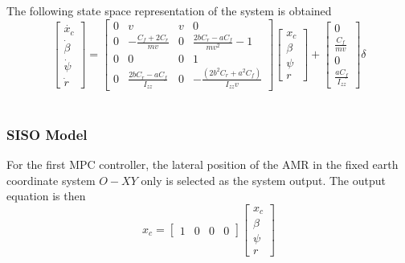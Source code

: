 \documentclass[a4paper, twocolumn]{article}
\begin{document}
\noindent
The following state space representation of the system is obtained
\footnotesize
$$
\begin{bmatrix}
    \dot{x_{c}}
    \\
    \dot{\beta}
    \\
    \dot{\psi}
    \\  
    \dot{r}
\end{bmatrix}=
\begin{bmatrix}
    0 & v & v & 0 \\ 
    0 & -\frac{C_{f}+2C_{r}}{mv} & 0 & \frac{2bC_{r} - aC_{f}}{mv^{2}} -1 \\ 
    0 & 0 & 0 & 1 \\ 
    0 & \frac{2bC_{r} - aC_{f}}{I_{zz}} & 0 & -\frac{\left(2b^{2}C_{r} + a^{2}C_{f}\right)}{I_{zz}v} 
\end{bmatrix}
\begin{bmatrix}
    x_{c}
    \\
    \beta
    \\
    \psi
    \\  
    r
\end{bmatrix}+
\begin{bmatrix}
    0
    \\
    \frac{C_{f}}{mv}
    \\
    0
    \\  
    \frac{aC_{f}}{I_{zz}}
\end{bmatrix} \delta$$
\\

\normalsize

\subsubsection{SISO Model}
For the first MPC controller, 
the lateral position of the AMR in the fixed earth coordinate system $O-XY$ only is selected as the system output. 
The output equation is then
\footnotesize
$$
x_{c}=
\begin{bmatrix}
    1&0&0&0
\end{bmatrix}
\begin{bmatrix}
    x_{c}
    \\
    \beta
    \\
    \psi
    \\  
    r
\end{bmatrix}
$$
\\

\normalsize
\end{document}
